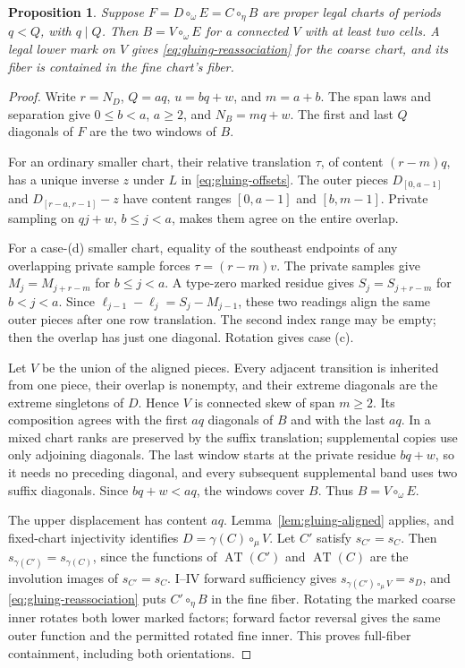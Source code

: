 \documentclass[11pt,a4paper]{amsart}
\numberwithin{equation}{section}
\theoremstyle{plain}
\newtheorem{proposition}[theorem]{Proposition}
\theoremstyle{definition}
\begin{document}
\begin{proposition}\label{prop:gluing-divisible}
Suppose \(F=D\circ_\omega E=C\circ_\eta B\) are proper legal charts of periods \(q<Q\), with \(q\mid Q\).  Then \(B=V\circ_\omega E\) for a connected \(V\) with at least two cells.  A legal lower mark on \(V\) gives \eqref{eq:gluing-reassociation} for the coarse chart, and its fiber is contained in the fine chart's fiber.
\end{proposition}
\begin{proof}
Write \(r=N_D\), \(Q=aq\), \(u=bq+w\), and \(m=a+b\).  The span laws and separation give \(0\le b<a\), \(a\ge2\), and \(N_B=mq+w\).  The first and last \(Q\) diagonals of \(F\) are the two windows of \(B\).

For an ordinary smaller chart, their relative translation \(\tau\), of content \((r-m)q\), has a unique inverse \(z\) under \(L\) in \eqref{eq:gluing-offsets}.  The outer pieces
\(D_{[0,a-1]}\) and \(D_{[r-a,r-1]}-z\)
have content ranges \([0,a-1]\) and \([b,m-1]\).  Private sampling on \(qj+w\), \(b\le j<a\), makes them agree on the entire overlap.

For a case-(d) smaller chart, equality of the southeast endpoints of any overlapping private sample forces \(\tau=(r-m)v\).  The private samples give \(M_j=M_{j+r-m}\) for \(b\le j<a\).  A type-zero marked residue gives \(S_j=S_{j+r-m}\) for \(b<j<a\).  Since \(\ell_{j-1}-\ell_j=S_j-M_{j-1}\), these two readings align the same outer pieces after one row translation.  The second index range may be empty; then the overlap has just one diagonal.  Rotation gives case (c).

Let \(V\) be the union of the aligned pieces.  Every adjacent transition is inherited from one piece, their overlap is nonempty, and their extreme diagonals are the extreme singletons of \(D\).  Hence \(V\) is connected skew of span \(m\ge2\).  Its composition agrees with the first \(aq\) diagonals of \(B\) and with the last \(aq\).  In a mixed chart ranks are preserved by the suffix translation; supplemental copies use only adjoining diagonals.  The last window starts at the private residue \(bq+w\), so it needs no preceding diagonal, and every subsequent supplemental band uses two suffix diagonals.  Since \(bq+w<aq\), the windows cover \(B\).  Thus \(B=V\circ_\omega E\).

The upper displacement has content \(aq\).  Lemma~\ref{lem:gluing-aligned} applies, and fixed-chart injectivity identifies \(D=\gamma(C)\circ_\mu V\).  Let \(C'\) satisfy \(s_{C'}=s_C\).  Then \(s_{\gamma(C')}=s_{\gamma(C)}\), since the functions of \(\operatorname{AT}(C')\) and \(\operatorname{AT}(C)\) are the involution images of \(s_{C'}=s_C\).  I--IV forward sufficiency gives \(s_{\gamma(C')\circ_\mu V}=s_D\), and \eqref{eq:gluing-reassociation} puts \(C'\circ_\eta B\) in the fine fiber.  Rotating the marked coarse inner rotates both lower marked factors; forward factor reversal gives the same outer function and the permitted rotated fine inner.  This proves full-fiber containment, including both orientations.
\end{proof}
\end{document}

